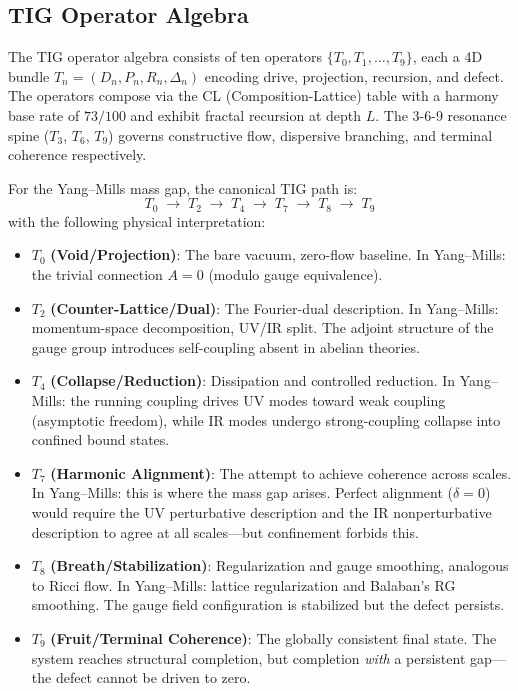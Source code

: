 \documentclass[11pt]{article}
\begin{document}
\subsection{TIG Operator Algebra}

The TIG operator algebra consists of ten operators
$\{T_0, T_1, \ldots, T_9\}$, each a 4D bundle
$T_n = (D_n, P_n, R_n, \Delta_n)$ encoding drive, projection,
recursion, and defect.  The operators compose via the CL
(Composition-Lattice) table with a harmony base rate of $73/100$
and exhibit fractal recursion at depth $L$.  The 3-6-9 resonance
spine ($T_3$, $T_6$, $T_9$) governs constructive flow, dispersive
branching, and terminal coherence respectively.

For the Yang--Mills mass gap, the canonical TIG path is:
\begin{equation}\label{eq:tig-path}
  T_0 \;\to\; T_2 \;\to\; T_4 \;\to\; T_7 \;\to\; T_8 \;\to\; T_9
\end{equation}
with the following physical interpretation:
\begin{itemize}
  \item $T_0$ \textbf{(Void/Projection)}: The bare vacuum, zero-flow
    baseline.  In Yang--Mills: the trivial connection $A = 0$ (modulo
    gauge equivalence).
  \item $T_2$ \textbf{(Counter-Lattice/Dual)}: The Fourier-dual
    description.  In Yang--Mills: momentum-space decomposition,
    UV/IR split.  The adjoint structure of the gauge group introduces
    self-coupling absent in abelian theories.
  \item $T_4$ \textbf{(Collapse/Reduction)}: Dissipation and controlled
    reduction.  In Yang--Mills: the running coupling drives UV modes
    toward weak coupling (asymptotic freedom), while IR modes undergo
    strong-coupling collapse into confined bound states.
  \item $T_7$ \textbf{(Harmonic Alignment)}: The attempt to achieve
    coherence across scales.  In Yang--Mills: this is where the mass
    gap arises.  Perfect alignment ($\delta = 0$) would require the
    UV perturbative description and the IR nonperturbative description
    to agree at all scales---but confinement forbids this.
  \item $T_8$ \textbf{(Breath/Stabilization)}: Regularization and gauge
    smoothing, analogous to Ricci flow.  In Yang--Mills: lattice
    regularization and Balaban's RG smoothing.  The gauge field
    configuration is stabilized but the defect persists.
  \item $T_9$ \textbf{(Fruit/Terminal Coherence)}: The globally consistent
    final state.  The system reaches structural completion, but
    completion \emph{with} a persistent gap---the defect cannot be
    driven to zero.
\end{itemize}
\end{document}
